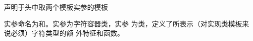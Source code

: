 声明于头中取两个模板实参的模板

\begin{note}
  实参命名为和。实参为字符容器类，实参
  为类，定义了所表示（对实现类模板来说必须）字符类型的额
  外特征和函数。
\end{note}
